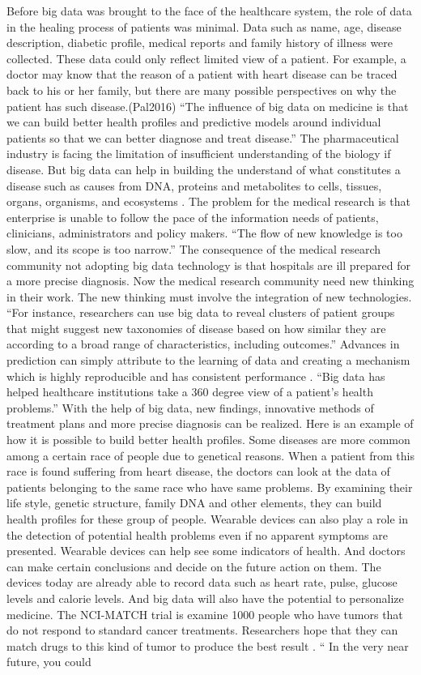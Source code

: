 \documentclass[sigconf]{acmart}
\begin{document}
Before big data was brought to the face of the healthcare system, the role of data in the healing process of patients was minimal. Data such as name, age, disease description, diabetic profile, medical reports and family history of illness were collected. These data could only reflect limited view of a patient. For example, a doctor may know that the reason of a patient with heart disease can be traced back to his or her family, but there are many possible perspectives on why the patient has such disease.(Pal2016)
``The influence of big data on medicine is that we can build better health profiles and predictive models around individual patients so that we can better diagnose and treat disease.'' The pharmaceutical industry is facing the limitation of insufficient understanding of the biology if disease. But big data can help in building the understand of what constitutes a disease such as causes from DNA, proteins and metabolites to cells, tissues, organs, organisms, and ecosystems \cite{Schadt}.  The problem for the medical research is that enterprise is unable to follow the pace of the information needs of patients, clinicians, administrators and policy makers. “The flow of new knowledge is too slow, and its scope is too narrow.” The consequence of the medical research community not adopting big data technology is that hospitals are ill prepared for a more precise diagnosis. Now the medical research community need new thinking in their work. The new thinking must involve the integration of new technologies. ``For instance, researchers can use big data to reveal clusters of patient groups that might suggest new taxonomies of disease based on how similar they are according to a broad range of characteristics, including outcomes.'' Advances in prediction can simply attribute to the learning of data and creating a mechanism which is highly reproducible and has consistent performance \cite{Krumholz2014}.  ``Big data has helped healthcare institutions take a 360 degree view of a patient's health problems.''  With the help of big data, new findings, innovative methods of treatment plans and more precise diagnosis can be realized. Here is an example of how it is possible to build better health profiles. Some diseases are more common among a certain race of people due to genetical reasons. When a patient from this race is found suffering from heart disease, the doctors can look at the data of patients belonging to the same race who have same problems. By examining their life style, genetic structure, family DNA and other elements, they can build health profiles for these group of people. Wearable devices can also play a role in the detection of potential health problems even if no apparent symptoms are presented. Wearable devices can help see some indicators of health. And doctors can make certain conclusions and decide on the future action on them. The devices today are already  able to record data such as heart rate, pulse, glucose levels and calorie levels.  And  big data will also have the potential to personalize medicine. The NCI-MATCH trial is examine 1000 people who have tumors that do not respond to standard cancer treatments. Researchers hope that they can match drugs to this kind of tumor to produce the best result \cite{Pal2016}. `` In the very near future, you could 
\end{document}
